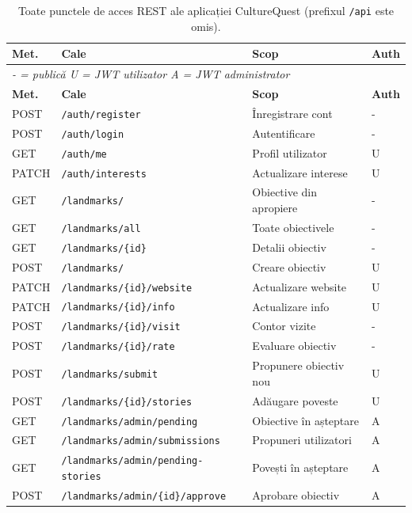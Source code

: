 \documentclass[12pt,a4paper]{report}
\begin{document}
\begin{appendices}
{\scriptsize
\begin{longtable}{|p{1.1cm}|p{5.5cm}|p{4.5cm}|p{1cm}|}
\caption{Toate punctele de acces REST ale aplicației CultureQuest (prefixul \texttt{/api} este omis).} \label{tab:all-endpoints} \\
\hline
\textbf{Met.} & \textbf{Cale} & \textbf{Scop} & \textbf{Auth} \\
\hline
\multicolumn{4}{|l|}{\textit{{-} = publică \quad U = JWT utilizator \quad A = JWT administrator}} \\
\hline
\endfirsthead
\hline
\textbf{Met.} & \textbf{Cale} & \textbf{Scop} & \textbf{Auth} \\
\hline
\endhead
POST & \texttt{/auth/register} & Înregistrare cont & - \\
\hline
POST & \texttt{/auth/login} & Autentificare & - \\
\hline
GET & \texttt{/auth/me} & Profil utilizator & U \\
\hline
PATCH & \texttt{/auth/interests} & Actualizare interese & U \\
\hline
GET & \texttt{/landmarks/} & Obiective din apropiere & - \\
\hline
GET & \texttt{/landmarks/all} & Toate obiectivele & - \\
\hline
GET & \texttt{/landmarks/\{id\}} & Detalii obiectiv & - \\
\hline
POST & \texttt{/landmarks/} & Creare obiectiv & U \\
\hline
PATCH & \texttt{/landmarks/\{id\}/website} & Actualizare website & U \\
\hline
PATCH & \texttt{/landmarks/\{id\}/info} & Actualizare info & U \\
\hline
POST & \texttt{/landmarks/\{id\}/visit} & Contor vizite & - \\
\hline
POST & \texttt{/landmarks/\{id\}/rate} & Evaluare obiectiv & - \\
\hline
POST & \texttt{/landmarks/submit} & Propunere obiectiv nou & U \\
\hline
POST & \texttt{/landmarks/\{id\}/stories} & Adăugare poveste & U \\
\hline
GET & \texttt{/landmarks/admin/pending} & Obiective în așteptare & A \\
\hline
GET & \texttt{/landmarks/admin/submissions} & Propuneri utilizatori & A \\
\hline
GET & \texttt{/landmarks/admin/pending-stories} & Povești în așteptare & A \\
\hline
POST & \texttt{/landmarks/admin/\{id\}/approve} & Aprobare obiectiv & A \\

\end{longtable}}
\end{appendices}
\end{document}
